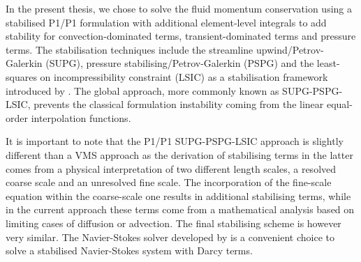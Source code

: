 In the present thesis, we chose to solve the fluid momentum conservation using a stabilised P1/P1 formulation with additional 
element-level integrals to add stability for convection-dominated terms, transient-dominated terms and pressure terms. 
The stabilisation techniques include the streamline upwind/Petrov-Galerkin (SUPG), pressure stabilising/Petrov-Galerkin (PSPG) and
the least-squares on incompressibility constraint (LSIC) as a stabilisation framework introduced by \citet{tezduyar_incompressible_1992}.
The global approach, more commonly known as SUPG-PSPG-LSIC, prevents the classical formulation instability coming from the 
linear equal-order interpolation functions.

It is important to note that the P1/P1 SUPG-PSPG-LSIC approach is slightly different than a VMS approach 
as the derivation of stabilising terms in the latter comes from a physical interpretation of two different 
length scales, a resolved coarse scale and an unresolved fine scale. The incorporation of the fine-scale equation
within the coarse-scale one results in additional stabilising terms, while in the current approach these terms
come from a mathematical analysis based on limiting cases of diffusion or advection. 
The final stabilising scheme is however very similar.
The Navier-Stokes solver developed by \citet{hachem_stabilized_2010,rivaux_simulation_2011} is a convenient choice 
to solve a stabilised Navier-Stokes system with Darcy terms. 

